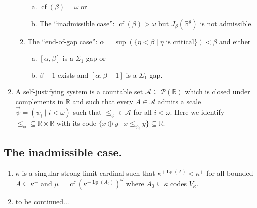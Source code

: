 \documentclass[12pt,a4paper]{article}
\theoremstyle{nicestyle}
\DeclareMathOperator{\cf}{cf}
\DeclareMathOperator{\Lp}{Lp}
\begin{document}
\begin{enumerate}
\begin{enumerate}[(1)]
\begin{enumerate}[(a)]
    \item $\cf(\beta) = \omega$ or
    \item The ``inadmissible case'': $\cf(\beta) > \omega$ but
      $J_{\beta}(\mathbb{R}^{g})$ is not admissible.
    \end{enumerate}
  \item The ``end-of-gap case'':
    $\alpha = \sup(\{ \eta < \beta \mid \eta \text{ is critical} \}) <
    \beta$ and either
    \begin{enumerate}[(a)]
    \item $[\alpha, \beta]$ is a $\Sigma_1$ gap or
    \item $\beta-1$ exists and $[\alpha, \beta-1]$ is a $\Sigma_1$
      gap.
    \end{enumerate}
  \end{enumerate}
\item A self-justifying system is a countable set
  $\mathcal{A} \subseteq \mathcal{P}(\mathbb{R})$ which is closed
  under complements in $\mathbb{R}$ and such that every
  $A \in \mathcal{A}$ admits a scale
  $\vec{\psi} = (\psi_{i} \mid i < \omega)$ such that
  $\le_{\phi} \in \mathcal{A}$ for all $i < \omega$. Here we identify
  $\le_{\phi} \subseteq \mathbb{R} \times \mathbb{R}$ with its code
  $\{ x \oplus y \mid x \le_{\psi_{i}} y \} \subseteq \mathbb{R}$.
\end{enumerate}

\subsection{The inadmissible case.}

\begin{enumerate}
\item $\kappa$ is a singular strong limit cardinal such that
  $\kappa^{+ \Lp(A)} < \kappa^+$ for all bounded
  $A \subseteq \kappa^+$ and
  $\mu = \cf(\kappa^{+ \Lp(A_{0})})^{\omega}$ where
  $A_0 \subseteq \kappa$ codes $V_{\kappa}$.
\item to be continued...
\end{enumerate}
% 
% 
\end{document}
